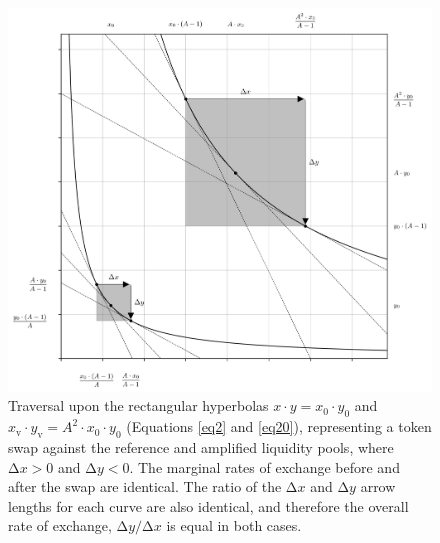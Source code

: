 \documentclass{article}
\begin{document}
\begin{figure}[ht]
    \centering
    \includegraphics[width=\textwidth]{fig14.png}
    \captionsetup{
        justification=raggedright,
        singlelinecheck=false,
        font=small,
        labelfont=bf,
        labelsep=quad,
        format=plain
    }
    \caption{Traversal upon the rectangular hyperbolas $x \cdot y = x_{0} \cdot y_{0}$ and $x_{\text{v}} \cdot y_{\text{v}} = A^{2} \cdot x_{0} \cdot y_{0}$ (Equations \ref{eq2} and \ref{eq20}), representing a token swap against the reference and amplified liquidity pools, where $\mathrm{\Delta}x > 0$ and $\mathrm{\Delta}y < 0$. The marginal rates of exchange before and after the swap are identical. The ratio of the $\mathrm{\Delta}x$ and $\mathrm{\Delta}y$ arrow lengths for each curve are also identical, and therefore the overall rate of exchange, $\mathrm{\Delta}y / \mathrm{\Delta}x$ is equal in both cases.}
    \label{fig14}
\end{figure}
\end{document}
